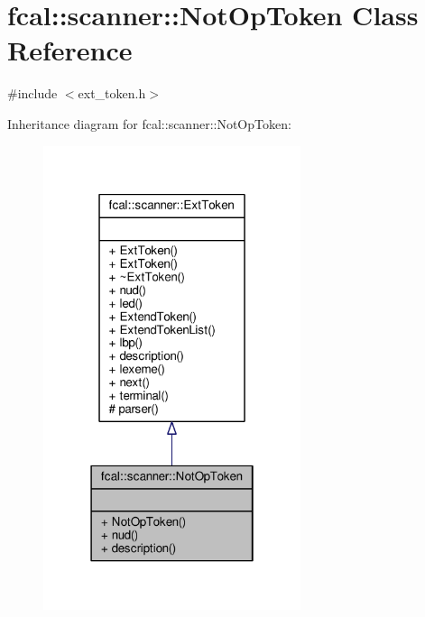 \hypertarget{classfcal_1_1scanner_1_1NotOpToken}{}\section{fcal\+:\+:scanner\+:\+:Not\+Op\+Token Class Reference}
\label{classfcal_1_1scanner_1_1NotOpToken}


{\ttfamily \#include $<$ext\+\_\+token.\+h$>$}



Inheritance diagram for fcal\+:\+:scanner\+:\+:Not\+Op\+Token\+:
\nopagebreak
\begin{figure}[H]
\begin{center}
\leavevmode
\includegraphics[width=214pt]{classfcal_1_1scanner_1_1NotOpToken__inherit__graph}
\end{center}
\end{figure}


